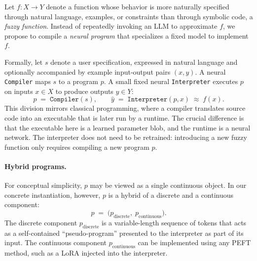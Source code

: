 \documentclass{article}
\theoremstyle{plain}
\theoremstyle{definition}
\theoremstyle{remark}
\begin{document}
Let $f : X \to Y$ denote a function whose behavior is more naturally specified through natural language, examples, or constraints than through symbolic code, a \textit{fuzzy function}. Instead of repeatedly invoking an LLM to approximate $f$, we propose to compile a \emph{neural program} that specializes a fixed model to implement $f$.

Formally, let $s$ denote a user specification, expressed in natural language and optionally accompanied by example input-output pairs $(x, y)$. A neural \texttt{Compiler} maps $s$ to a program $p$. A small fixed neural \texttt{Interpreter} executes $p$ on inputs $x \in X$ to produce outputs $\hat{y} \in Y$:
\begin{equation}
\label{eq:paw}
p \;=\; \texttt{Compiler}(s),
\qquad
\hat{y} \;=\; \texttt{Interpreter}(p, x)
\;\approx\; f(x).
\end{equation}
This division mirrors classical programming, where a compiler translates source code into an executable that is later run by a runtime. The crucial difference is that the executable here is a learned parameter blob, and the runtime is a neural network. The interpreter does not need to be retrained: introducing a new fuzzy function only requires compiling a new program $p$.

\paragraph{Hybrid programs.}
For conceptual simplicity, $p$ may be viewed as a single continuous object. In our concrete instantiation, however, $p$ is a hybrid of a discrete and a continuous component:
\begin{equation}
\label{eq:hybrid_program}
p \;=\; \bigl( p_{\text{discrete}}, \; p_{\text{continuous}} \bigr).
\end{equation}
The discrete component $p_{\text{discrete}}$ is a variable-length sequence of tokens that acts as a self-contained ``pseudo-program'' presented to the interpreter as part of its input. The continuous component $p_{\text{continuous}}$ can be implemented using any PEFT method, such as a LoRA injected into the interpreter. %
\end{document}

